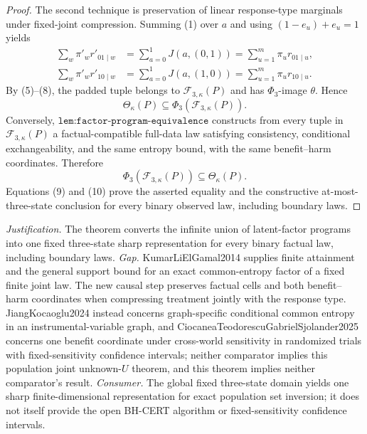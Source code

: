 \documentclass{article}
\begin{document}
\begin{proof}
The second technique is preservation of linear response-type marginals under fixed-joint compression.  Summing (1) over \(a\) and using \((1-e_u)+e_u=1\) yields
\[
\begin{aligned}
\sum_w\pi'_wr'_{01\mid w}
&=\sum_{a=0}^1J(a,(0,1))
=\sum_{u=1}^m\pi_ur_{01\mid u},\\
\sum_w\pi'_wr'_{10\mid w}
&=\sum_{a=0}^1J(a,(1,0))
=\sum_{u=1}^m\pi_ur_{10\mid u}.
\end{aligned}
\tag{8}
\]
By (5)--(8), the padded tuple belongs to \(\mathcal F_{3,\kappa}(P)\) and has \(\Phi_3\)-image \(\theta\).  Hence
\[
\Theta_\kappa(P)\subseteq\Phi_3(\mathcal F_{3,\kappa}(P)).
\tag{9}
\]
Conversely, \(\texttt{lem:factor-program-equivalence}\) constructs from every tuple in \(\mathcal F_{3,\kappa}(P)\) a factual-compatible full-data law satisfying consistency, conditional exchangeability, and the same entropy bound, with the same benefit--harm coordinates.  Therefore
\[
\Phi_3(\mathcal F_{3,\kappa}(P))\subseteq\Theta_\kappa(P).
\tag{10}
\]
Equations (9) and (10) prove the asserted equality and the constructive at-most-three-state conclusion for every binary observed law, including boundary laws.
\end{proof}
\par\smallskip\noindent \textit{Justification.} The theorem converts the infinite union of latent-factor programs into one fixed three-state sharp representation for every binary factual law, including boundary laws. \textit{Gap.} KumarLiElGamal2014 supplies finite attainment and the general support bound for an exact common-entropy factor of a fixed finite joint law. The new causal step preserves factual cells and both benefit--harm coordinates when compressing treatment jointly with the response type. JiangKocaoglu2024 instead concerns graph-specific conditional common entropy in an instrumental-variable graph, and CiocaneaTeodorescuGabrielSjolander2025 concerns one benefit coordinate under cross-world sensitivity in randomized trials with fixed-sensitivity confidence intervals; neither comparator implies this population joint unknown-\(U\) theorem, and this theorem implies neither comparator's result. \textit{Consumer.} The global fixed three-state domain yields one sharp finite-dimensional representation for exact population set inversion; it does not itself provide the open BH-CERT algorithm or fixed-sensitivity confidence intervals.
\end{document}
